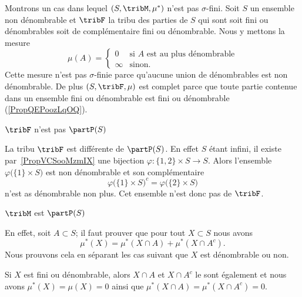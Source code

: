 \begin{example} \label{ExOIXoosScTC}
    Montrons un cas dans lequel \( (S,\tribM,\mu^*)\) n'est pas \( \sigma\)-fini. Soit \( S\) un ensemble non dénombrable et \( \tribF\) la tribu des parties de \( S\) qui sont soit fini ou dénombrables soit de complémentaire fini ou dénombrable. Nous y mettons la mesure
    \begin{equation}
        \mu(A)=\begin{cases}
            0    &   \text{si } A\text{ est au plus dénombrable}\\
            \infty    &    \text{sinon}.
        \end{cases}
    \end{equation}
    Cette mesure n'est pas \( \sigma\)-finie parce qu'aucune union de dénombrables est non dénombrable. De plus \( (S,\tribF,\mu)\) est complet parce que toute partie contenue dans un ensemble fini ou dénombrable est fini ou dénombrable (\ref{PropQEPoozLqOQ}).

    \begin{subproof}
     \item[\( \tribF\) n'est pas \( \partP(S)\)]

        La tribu \( \tribF\) est différente de \( \partP(S)\). En effet \( S\) étant infini, il existe par~\ref{PropVCSooMzmIX} une bijection \( \varphi\colon \{ 1,2 \}\times S\to S\). Alors l'ensemble \( \varphi\big( \{ 1 \}\times S \big)\) est non dénombrable et son complémentaire
        \begin{equation}
            \varphi\big( \{ 1 \}\times S \big)^c=\varphi\big( \{ 2 \}\times S \big)
        \end{equation}
        n'est as dénombrable non plus. Cet ensemble n'est donc pas de \( \tribF\).

    \item[\( \tribM\) est \( \partP(S)\)]

        En effet, soit \( A\subset S\); il faut prouver que pour tout \( X\subset S\) nous avons
        \begin{equation}
            \mu^*(X)=\mu^*(X\cap A)+\mu^*(X\cap A^c).
        \end{equation}
        Nous prouvons cela en séparant les cas suivant que \( X\) est dénombrable ou non.

        Si \( X\) est fini ou dénombrable, alors \( X\cap A\) et \( X\cap A^c\) le sont également et nous avons \( \mu^*(X)=\mu(X)=0\) ainsi que \( \mu^*(X\cap A)=\mu^*(X\cap A^c)=0\).


\end{subproof}
\end{example}
